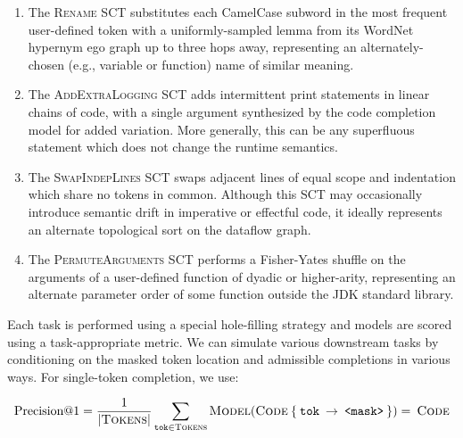 \documentclass[usenames,dvipsnames]{article} %
\begin{document}
  \begin{enumerate}[itemsep=1ex]
    \item The \textsc{Rename} SCT substitutes each CamelCase subword in the most frequent user-defined token with a uniformly-sampled lemma from its WordNet hypernym ego graph up to three hops away, representing an alternately-chosen (e.g., variable or function) name of similar meaning.
    \item The \textsc{AddExtraLogging} SCT adds intermittent print statements in linear chains of code, with a single argument synthesized by the code completion model for added variation. More generally, this can be any superfluous statement which does not change the runtime semantics.
    \item The \textsc{SwapIndepLines} SCT swaps adjacent lines of equal scope and indentation which share no tokens in common. Although this SCT may occasionally introduce semantic drift in imperative or effectful code, it ideally represents an alternate topological sort on the dataflow graph.
    \item The \textsc{PermuteArguments} SCT performs a Fisher-Yates shuffle on the arguments of a user-defined function of dyadic or higher-arity, representing an alternate parameter order of some function outside the JDK standard library.
  \end{enumerate}


  Each task is performed using a special hole-filling strategy and models are scored using a task-appropriate metric. We can simulate various downstream tasks by conditioning on the masked token location and admissible completions in various ways. For single-token completion, we use:

  \begin{equation*}
    \text{Precision@1} = \frac{1}{{|\textsc{Tokens}|}}\sum_{\texttt{tok}\in \textsc{Tokens}}\textsc{Model}(\textsc{Code}\:\{\:\texttt{tok}\:\rightarrow\:\texttt{<mask>}\:\}) = \:\textsc{Code}
  \end{equation*}
\end{document}
